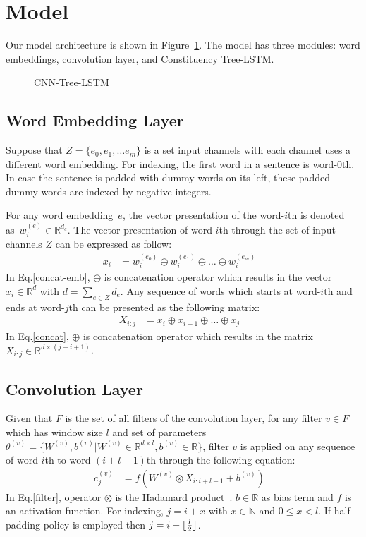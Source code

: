 \section{Model}\label{sec:cnn-treelstm}
Our model architecture is shown in Figure~\ref{fig:cnn-treelstm}.
The model has three modules: word embeddings, convolution layer, and Constituency Tree-LSTM.
\begin{figure} [H]
	\centering
	\label{fig:cnn-treelstm}
	\caption[qwerty]{CNN-Tree-LSTM}
\end{figure}
\subsection{Word Embedding Layer}
Suppose that \(Z = \{e_0, e_1, \ldots e_m\}\) is a set input channels with each channel uses a different word embedding.
For indexing, the first word in a sentence is word-\(0\)th.
In case the sentence is padded with dummy words on its left, these padded dummy words are indexed by negative integers.

For any word embedding~\(e\), the vector presentation of the word-\(i\)th is denoted as~\(w^{(e)}_i \in \mathbb{R}^{d_e}\).
The vector presentation of word-\(i\)th through the set of input channels \(Z\) can be expressed as follow:
\begin{align}
 x_i &= w^{(e_0)}_i \ominus w^{(e_1)}_i \ominus  \ldots \ominus w^{(e_m)}_i&\label{concat-emb}
\end{align}
In Eq.\eqref{concat-emb}, \(\ominus\) is concatenation operator which results in the vector \(x_i \in \mathbb{R}^{d}\) with \(d = \sum_{e \in Z} d_e\).
Any sequence of words which starts at word-\(i\)th and ends at word-\(j\)th can be presented as the following matrix:
\begin{align}
X_{i:j} &= x_i \oplus x_{i+1} \oplus \ldots \oplus x_j &\label{concat}
\end{align}
In Eq.\eqref{concat}, \(\oplus\) is concatenation operator which results in the matrix \(X_{i:j} \in \mathbb{R}^{d \times (j-i+1)}\).
\subsection{Convolution Layer}\label{sec:cnn}
Given that \(F\) is the set of all filters of the convolution layer, for any filter \(v \in F\) which has window size \(l\) and set of parameters \(\theta^{(v)} = \{ W^{(v)}, b^{(v)} | W^{(v)} \in \mathbb{R}^{d \times l}, b^{(v)} \in \mathbb{R}\}\), filter \({v}\) is applied on any sequence of word-\(i\)th to word-\((i+l-1)\)th through the following equation:
\begin{align}
c^{(v)}_j &= f(W^{(v)} \otimes X_{i:i+l-1} + b^{(v)}) &\label{filter}
\end{align}
In Eq.\eqref{filter}, operator \(\otimes\) is the Hadamard product~\cite{element-prod}.
\(b \in \mathbb{R}\) as bias term and \(f\) is an activation function.
For indexing, \(j = i + x\) with \(x \in \mathbb{N}\) and \(0 \leq x < l\).
If half-padding policy is employed then \(j = i + \lfloor \frac{l}{2} \rfloor\).

